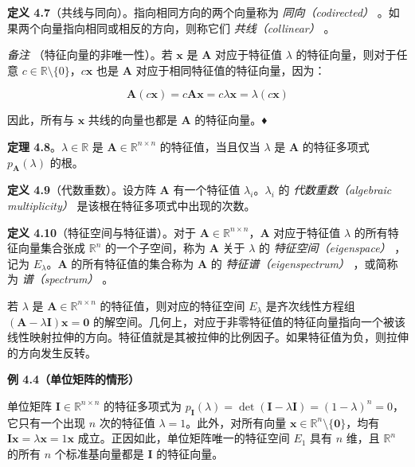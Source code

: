 \textbf{定义 4.7}（共线与同向）。指向相同方向的两个向量称为 \emph{同向（codirected）} 。如果两个向量指向相同或相反的方向，则称它们 \emph{共线（collinear）} 。

\emph{备注} （特征向量的非唯一性）。若 $ \boldsymbol{x} $ 是 $ \boldsymbol{A} $ 对应于特征值 $ \lambda $ 的特征向量，则对于任意 $ c \in \mathbb{R} \setminus \{0\} $，$ c\boldsymbol{x} $ 也是 $ \boldsymbol{A} $ 对应于相同特征值的特征向量，因为：

\begin{equation}
\boldsymbol{A}(c\boldsymbol{x}) = c\boldsymbol{A}\boldsymbol{x} = c\lambda\boldsymbol{x} = \lambda(c\boldsymbol{x})
\tag{4.26}\label{eq:4-26}
\end{equation}

因此，所有与 $ \boldsymbol{x} $ 共线的向量也都是 $ \boldsymbol{A} $ 的特征向量。♦

\textbf{定理 4.8}。$ \lambda \in \mathbb{R} $ 是 $ \boldsymbol{A} \in \mathbb{R}^{n \times n} $ 的特征值，当且仅当 $ \lambda $ 是 $ \boldsymbol{A} $ 的特征多项式 $ p_{\boldsymbol{A}}(\lambda) $ 的根。

\textbf{定义 4.9}（代数重数）。设方阵 $ \boldsymbol{A} $ 有一个特征值 $ \lambda_i $。$ \lambda_i $ 的 \emph{代数重数（algebraic multiplicity）} 是该根在特征多项式中出现的次数。

\textbf{定义 4.10}（特征空间与特征谱）。对于 $ \boldsymbol{A} \in \mathbb{R}^{n \times n} $，$ \boldsymbol{A} $ 对应于特征值 $ \lambda $ 的所有特征向量集合张成 $ \mathbb{R}^n $ 的一个子空间，称为 $ \boldsymbol{A} $ 关于 $ \lambda $ 的 \emph{特征空间（eigenspace）} ，记为 $ E_\lambda $。$ \boldsymbol{A} $ 的所有特征值的集合称为 $ \boldsymbol{A} $ 的 \emph{特征谱（eigenspectrum）} ，或简称为 \emph{谱（spectrum）} 。

若 $ \lambda $ 是 $ \boldsymbol{A} \in \mathbb{R}^{n \times n} $ 的特征值，则对应的特征空间 $ E_\lambda $ 是齐次线性方程组 $ (\boldsymbol{A} - \lambda \boldsymbol{I})\boldsymbol{x} = \boldsymbol{0} $ 的解空间。几何上，对应于非零特征值的特征向量指向一个被该线性映射拉伸的方向。特征值就是其被拉伸的比例因子。如果特征值为负，则拉伸的方向发生反转。

\begin{notebox}
\textbf{例 4.4（单位矩阵的情形）}
\end{notebox}

\begin{notebox}
单位矩阵 $ \boldsymbol{I} \in \mathbb{R}^{n \times n} $ 的特征多项式为 $ p_{\boldsymbol{I}}(\lambda) = \det(\boldsymbol{I} - \lambda \boldsymbol{I}) = (1 - \lambda)^n = 0 $，它只有一个出现 $ n $ 次的特征值 $ \lambda = 1 $。此外，对所有向量 $ \boldsymbol{x} \in \mathbb{R}^n \setminus \{\boldsymbol{0}\} $，均有 $ \boldsymbol{I} \boldsymbol{x} = \lambda \boldsymbol{x} = 1 \boldsymbol{x} $ 成立。正因如此，单位矩阵唯一的特征空间 $ E_1 $ 具有 $ n $ 维，且 $ \mathbb{R}^n $ 的所有 $ n $ 个标准基向量都是 $ \boldsymbol{I} $ 的特征向量。
\end{notebox}

